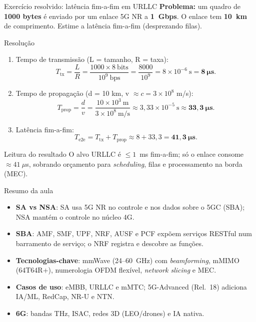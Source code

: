 \documentclass[aspectratio=169,11pt]{beamer}
\begin{document}
\begin{frame}{Exercício resolvido: latência fim-a-fim em URLLC}
  \textbf{Problema:} um quadro de \textbf{1000 bytes} é enviado por um enlace 5G NR a \textbf{1~Gbps}. O enlace tem \textbf{10~km} de comprimento. Estime a latência fim-a-fim (desprezando filas).
  \begin{block}{Resolução}
    \begin{enumerate}
      \item Tempo de transmissão (L = tamanho, R = taxa):
        \[
          T_{\text{tx}} = \frac{L}{R} = \frac{1000 \times 8~\text{bits}}{10^9~\text{bps}} = \frac{8000}{10^9} = 8 \times 10^{-6}~\text{s} = \mathbf{8~\mu s}.
        \]
      \item Tempo de propagação (d = 10 km, v $\approx c = 3\times10^8$ m/s):
        \[
          T_{\text{prop}} = \frac{d}{v} = \frac{10 \times 10^3~\text{m}}{3 \times 10^8~\text{m/s}} \approx 3,33 \times 10^{-5}~\text{s} \approx \mathbf{33,3~\mu s}.
        \]
      \item Latência fim-a-fim:
        \[
          T_{\text{e2e}} = T_{\text{tx}} + T_{\text{prop}} \approx 8 + 33,3 = \mathbf{41,3~\mu s}.
        \]
    \end{enumerate}
  \end{block}
  \begin{alertblock}{Leitura do resultado}
    O alvo URLLC é $\le 1$~ms fim-a-fim; só o enlace consome $\approx 41~\mu$s, sobrando orçamento para \emph{scheduling}, filas e processamento na borda (MEC).
  \end{alertblock}
\end{frame}

\begin{frame}{Resumo da aula}
  \begin{itemize}
    \item \textbf{SA vs NSA}: SA usa 5G NR no controle e nos dados sobre o 5GC (SBA); NSA mantém o controle no núcleo 4G.
    \item \textbf{SBA}: AMF, SMF, UPF, NRF, AUSF e PCF expõem serviços RESTful num barramento de serviço; o NRF registra e descobre as funções.
    \item \textbf{Tecnologias-chave}: mmWave (24--60~GHz) com \emph{beamforming}, mMIMO (64T64R+), numerologia OFDM flexível, \emph{network slicing} e MEC.
    \item \textbf{Casos de uso}: eMBB, URLLC e mMTC; 5G-Advanced (Rel.~18) adiciona IA/ML, RedCap, NR-U e NTN.
    \item \textbf{6G}: bandas THz, ISAC, redes 3D (LEO/drones) e IA nativa.
  \end{itemize}
\end{frame}
\end{document}
